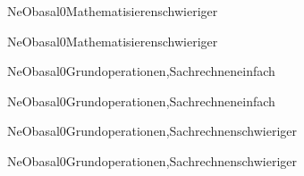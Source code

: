 \documentclass[12pt]{article}
\begin{document}
\begin{Add}{NeO}{basal0}{Mathematisieren}{schwieriger}
\solution{ }
\end{Add}
\begin{Add}{NeO}{basal0}{Mathematisieren}{schwieriger}
\end{Add}

\begin{Add}{NeO}{basal0}{Grundoperationen,Sachrechnen}{einfach}
\solution{ }
\end{Add}
\begin{Add}{NeO}{basal0}{Grundoperationen,Sachrechnen}{einfach}
\end{Add}

\begin{Add}{NeO}{basal0}{Grundoperationen,Sachrechnen}{schwieriger}
\solution{ }
\end{Add}
\begin{Add}{NeO}{basal0}{Grundoperationen,Sachrechnen}{schwieriger}
\end{Add}
\end{document}
